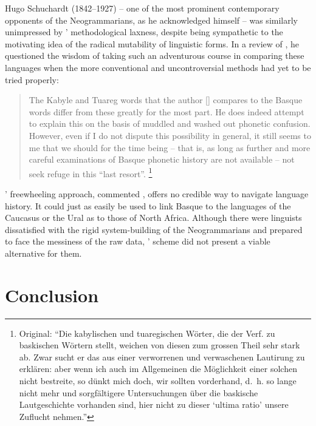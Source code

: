 \documentclass[output=paper]{langscibook}
\begin{document}
Hugo Schuchardt (1842--1927) -- one of the most prominent contemporary opponents of the Neogrammarians, as he acknowledged himself \citep[see, e.g., ][]{Schuchardt1928} -- was similarly unimpressed by {\Gabelentz}' methodological laxness, despite being sympathetic to the motivating idea of the radical mutability of linguistic forms. In a review of \citet{Gabelentz1894bb}, he questioned the wisdom of taking such an adventurous course in comparing these languages when the more conventional and uncontroversial methods had yet to be tried properly:

\largerpage[-1]
\begin{quotation}
The Kabyle and Tuareg words that the author [{\Gabelentz}] compares to the Basque words differ from these greatly for the most part. He does indeed attempt to explain this on the basis of muddled and washed out phonetic confusion. However, even if I do not dispute this possibility in general, it still seems to me that we should for the time being -- that is, as long as further and more careful examinations of Basque phonetic history are not available -- not seek refuge in this ``last resort''. \citep[334]{Schuchardt1893}\footnote{Original: ``Die kabylischen und tuaregischen Wörter, die der Verf. zu baskischen Wörtern stellt, weichen von diesen zum grossen Theil sehr stark ab. Zwar sucht er das aus einer verworrenen und verwaschenen Lautirung zu erklären: aber wenn ich auch im Allgemeinen die Möglichkeit einer solchen nicht bestreite, so dünkt mich doch, wir sollten vorderhand, d.~h. so lange nicht mehr und sorgfältigere Untersuchungen über die baskische Lautgeschichte vorhanden sind, hier nicht zu dieser `ultima ratio' unsere Zuflucht nehmen.''}
\end{quotation}

{\Gabelentz}' freewheeling approach, commented \citet[334]{Schuchardt1893}, offers no credible way to navigate language history. It could just as easily be used to link Basque to the languages of the Caucasus or the Ural as to those of North Africa. Although there were linguists dissatisfied with the rigid system-building of the Neogrammarians and prepared to face the messiness of the raw data, {\Gabelentz}' scheme did not present a viable alternative for them.

\section{Conclusion}
\label{sec:mcelvenny:conc}
\end{document}
